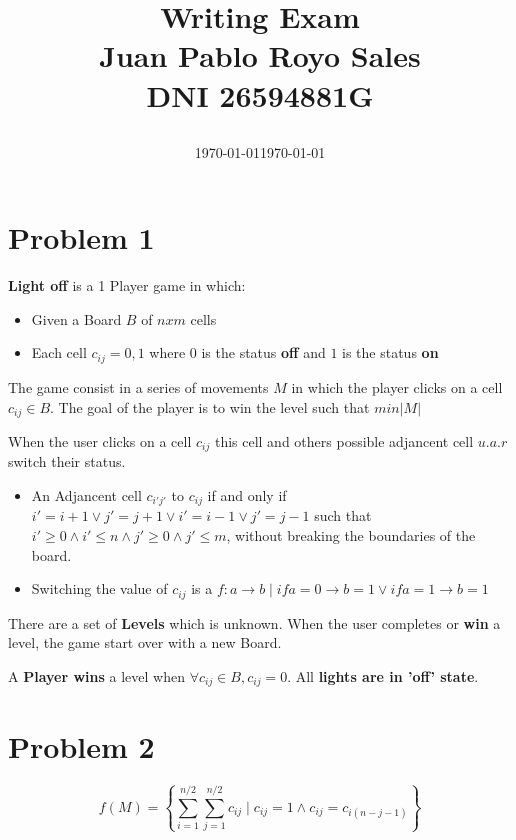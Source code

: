 \documentclass[12pt, a4paper]{article}
\title{
  Writing Exam\\
  Juan Pablo Royo Sales\\
  DNI 26594881G\\
  \date\today\vspace{-2em}}
\date{\normalize\today}
\begin{document}
\maketitle

\section{Problem 1}
\textbf{Light off} is a 1 Player game in which:

\begin{itemize}
\item Given a Board $B$ of $n x m$ cells
\item Each cell $c_{ij} = {0,1}$ where $0$ is the status \textbf{off} and $1$ is
  the status \textbf{on}
\end{itemize}

The game consist in a series of movements $M$ in which the player clicks on a
cell $c_{ij} \in B$. The goal of the player is to win the level such that
$min|M|$

When the user clicks on a cell $c_{ij}$ this cell and others possible adjancent
cell $u.a.r$ switch their status.

\begin{itemize}
\item An Adjancent cell $c_{i'j'}$ to $c_{ij}$ if and only if $i' = i + 1 \lor j' = j + 1
  \lor i' = i - 1 \lor j' = j - 1$ such that $i' \geq 0 \land i' \leq n \land j'
  \geq 0 \land j' \leq m$, without breaking the boundaries of the board.
\item Switching the value of $c_{ij}$ is a $f: a \rightarrow b \mid if a = 0
  \rightarrow b = 1 \lor if a = 1 \rightarrow b = 1$ 
\end{itemize}

There are a set of \textbf{Levels} which is unknown. When the user completes or
\textbf{win} a level, the game start over with a new Board.

A \textbf{Player wins} a level when $\forall c_{ij} \in B, c_{ij} = 0$. All
\textbf{lights are in 'off' state}.

\section{Problem 2}

\begin{equation}
  f(M) = \left\{ \sum_{i = 1}^{n/2} \sum_{j = 1}^{n/2} c_{ij} \mid c_{ij} = 1 \land c_{ij} = c_{i(n-j-1)} \right\}
\end{equation}
\end{document}
